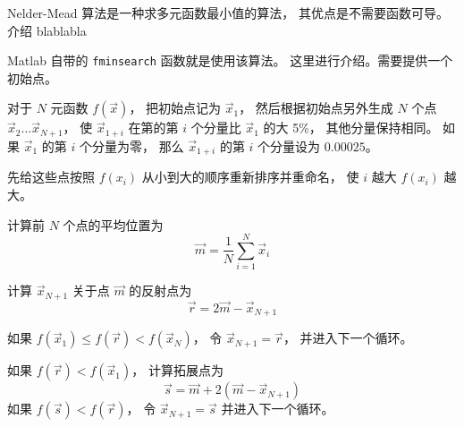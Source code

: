 

Nelder-Mead 算法是一种求多元函数最小值的算法， 其优点是不需要函数可导。 介绍 blablabla

Matlab 自带的 \texttt{fminsearch} 函数就是使用该算法。 这里进行介绍。需要提供一个初始点。

对于 $N$ 元函数 $f(\vec x)$， 把初始点记为 $\vec x_1$， 然后根据初始点另外生成 $N$ 个点 $\vec x_2\dots\vec x_{N + 1}$， 使 $\vec x_{1 + i}$ 在第的第 $i$ 个分量比 $\vec x_1$ 的大 5\%， 其他分量保持相同。 如果 $\vec x_1$ 的第 $i$ 个分量为零， 那么 $\vec x_{1 + i}$ 的第 $i$ 个分量设为 $0.00025$。

先给这些点按照 $f(x_i)$ 从小到大的顺序重新排序并重命名， 使 $i$ 越大 $f(x_i)$ 越大。

计算前 $N$ 个点的平均位置为
\begin{equation}
\vec m = \frac 1N \sum_{i=1}^N \vec x_i
\end{equation}


计算 $\vec x_{N + 1}$ 关于点 $\vec m$ 的反射点为
\begin{equation}
\vec r = 2\vec m - \vec x_{N + 1}
\end{equation}

如果 $f(\vec x_1) \le f(\vec r) < f(\vec x_N)$， 令 $\vec x_{N+1} = \vec r$， 并进入下一个循环。

如果 $f(\vec r) < f(\vec x_1)$， 计算拓展点为
\begin{equation}
\vec s = \vec m + 2(\vec m - \vec x_{N+1})
\end{equation}
如果 $f(\vec s) < f(\vec r)$， 令 $\vec x_{N+1} = \vec s$ 并进入下一个循环。